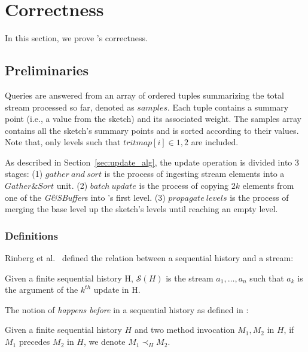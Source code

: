 \chapter{Correctness}
\label{chap:correctness}


In this section, we prove \mysketch's correctness. 

\section{Preliminaries}

Queries are answered from an array of ordered tuples summarizing the total stream processed so far, denoted as $\mathit{samples}$. Each tuple contains a summary point (i.e., a value from the sketch) and its associated weight. The samples array contains all the sketch's summary points and is sorted according to their values. Note that, only levels such that $\mathit{tritmap}[i]\in{1,2}$ are included.

As described in Section~\ref{sec:update_alg}, the update operation is divided into 3 stages: 
(1) $\mathit{gather\ and\ sort}$ is the process of ingesting stream elements into a $\mathit{Gather\&Sort}$ unit.
(2) $\mathit{batch\ update}$ is the process of copying $2k$ elements from one of the \emph{G\&SBuffer}s into \mysketch's first level. 
(3) $\mathit{propagate\ levels}$ is the process of merging the base level up the sketch's levels until reaching an empty level. 





\subsection{Definitions}

Rinberg et al.~\cite{Rinberg_2020_fast_sketches} defined the relation between a sequential history and a stream:
\begin{definition} 
Given a finite sequential history H, $\mathcal{S}(H)$ is the stream $a_1,\dots,a_n$ such that $a_k$ is the argument of the $k^{th}$ update in H.
\end{definition}


The notion of \emph{happens before} in a sequential history as defined in \cite{Rinberg_2020_fast_sketches}:
\begin{definition}
Given a finite sequential history $\mathit{H}$ and two method invocation $M_1,M_2$ in $\mathit{H}$, if $M_1$ precedes $M_2$ in $\mathit{H}$, we denote $M_1 \prec_H M_2$.
\end{definition}

